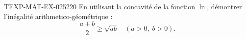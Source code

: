 \begin{exercice}{TEXP-MAT-EX-025}{2}{20}
En utilisant la concavité de la fonction $\ln$, démontrer l'inégalité arithmetico-géométrique :
\[ \frac{a+b}{2} \geq \sqrt{ab} \quad (a > 0,\; b > 0). \]

\end{exercice}
